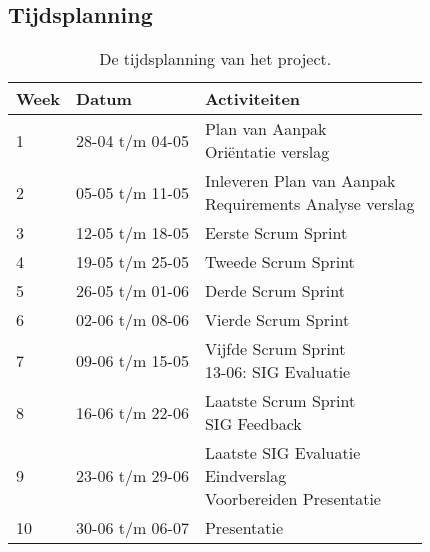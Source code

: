 \begin{appendices}
	\section{Tijdsplanning} \label{app:A}
	\begin{table}[!h]
	\def\arraystretch{1.5}
	\begin{tabularx}{\textwidth}{| p{1cm} | p{3cm}| X |}
	\hline
	\textbf{Week} & \textbf{Datum} & \textbf{Activiteiten} \\ \hline
	1 & 28-04 t/m 04-05 & \specialcell{Plan van Aanpak\\Ori\"entatie verslag}\\ \hline
	2 & 05-05 t/m 11-05 & \specialcell{Inleveren Plan van Aanpak\\Requirements Analyse verslag}\\ \hline
	3 & 12-05 t/m 18-05 & Eerste Scrum Sprint\\ \hline
	4 & 19-05 t/m 25-05 & Tweede Scrum Sprint\\ \hline
	5 & 26-05 t/m 01-06 & Derde Scrum Sprint\\ \hline
	6 & 02-06 t/m 08-06 & Vierde Scrum Sprint\\ \hline
	7 & 09-06 t/m 15-05 & \specialcell{Vijfde Scrum Sprint\\13-06: SIG Evaluatie}\\ \hline
	8 & 16-06 t/m 22-06 & \specialcell{Laatste Scrum Sprint\\SIG Feedback}\\ \hline
	9 & 23-06 t/m 29-06 & \specialcell{Laatste SIG Evaluatie\\Eindverslag\\Voorbereiden Presentatie}\\ \hline
	10 & 30-06 t/m 06-07 & Presentatie\\ \hline
	\end{tabularx}
	\caption{De tijdsplanning van het project.}
	\end{table}

\end{appendices}